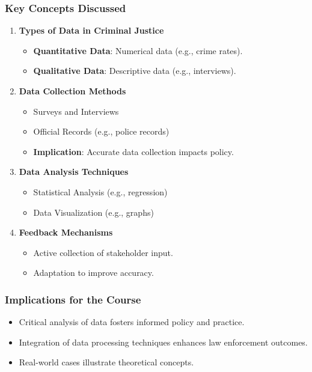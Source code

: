 \documentclass[aspectratio=169]{beamer}
\begin{document}
\begin{frame}[fragile]
    \frametitle{Key Concepts Discussed}
    \begin{enumerate}
        \item \textbf{Types of Data in Criminal Justice}
            \begin{itemize}
                \item \textbf{Quantitative Data}: Numerical data (e.g., crime rates).
                \item \textbf{Qualitative Data}: Descriptive data (e.g., interviews).
            \end{itemize}
        \item \textbf{Data Collection Methods}
            \begin{itemize}
                \item Surveys and Interviews
                \item Official Records (e.g., police records)
                \item \textbf{Implication}: Accurate data collection impacts policy.
            \end{itemize}
        \item \textbf{Data Analysis Techniques}
            \begin{itemize}
                \item Statistical Analysis (e.g., regression)
                \item Data Visualization (e.g., graphs)
            \end{itemize}
        \item \textbf{Feedback Mechanisms}
            \begin{itemize}
                \item Active collection of stakeholder input.
                \item Adaptation to improve accuracy.
            \end{itemize}
    \end{enumerate}
\end{frame}

\begin{frame}[fragile]
    \frametitle{Implications for the Course}
    \begin{itemize}
        \item Critical analysis of data fosters informed policy and practice.
        \item Integration of data processing techniques enhances law enforcement outcomes.
        \item Real-world cases illustrate theoretical concepts.
    \end{itemize}
\end{frame}
\end{document}
